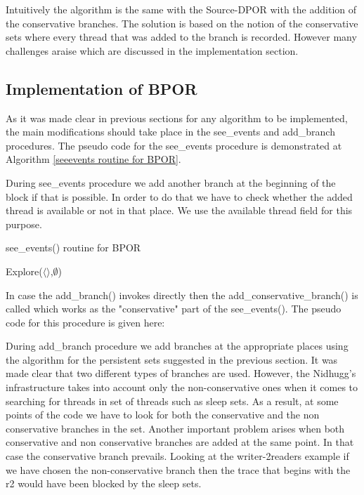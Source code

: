 Intuitively the algorithm is the same with the Source-DPOR with the addition of the conservative branches. The solution is based on the notion of the conservative sets where every thread that was added to the branch is recorded.  However many challenges araise which are discussed 
in the implementation section.


\subsection{Implementation of BPOR}
As it was made clear in previous sections for any algorithm to be implemented, the main modifications should take place in the see\_events and add\_branch procedures. 
The pseudo code for the see\_events procedure is demonstrated at Algorithm \ref{seeevents routine for BPOR}.

During see\_events procedure we add another branch at the beginning of the block if that is possible. In order to do that we have to check whether the added thread
is available or not in that place. We use the available thread field for this purpose.

\begin{algorithm}[H]
    \caption{see\_events() routine for BPOR}
    \label{seeevents routine for BPOR}
    Explore($\langle \rangle$,$\emptyset$)\;
\end{algorithm}

In case the add\_branch() invokes directly then the add\_conservative\_branch() is called which works as the "conservative" part of the see\_events().
The pseudo code for this procedure is given here:

During add\_branch procedure we add branches at the appropriate places using the algorithm for the persistent sets suggested in the previous section.
It was made clear that two different types of branches are used. However, the Nidhugg's infrastructure takes into account only the non-conservative ones when it comes
to searching for threads in set of threads such as sleep sets. As a result, at some points of the code we have to look for both the conservative and the non conservative
branches in the set. 
Another important problem arises when both conservative and non conservative branches are added at the same point. In that case the conservative branch prevails.
Looking at the writer-2readers example if we have chosen the non-conservative branch then the trace that begins with the r2 would have been blocked by the sleep sets.

